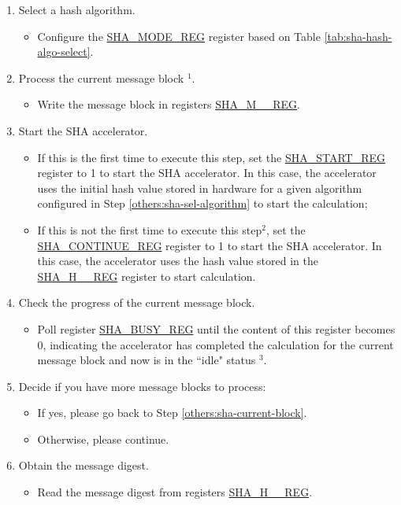 \begin{enumerate}
    \item \label{others:sha-sel-algorithm} Select a hash algorithm.
    \begin{itemize}
        \item Configure the \hyperref[regdesc:SHAMODEREG]{SHA\_MODE\_REG} register based on Table \ref{tab:sha-hash-algo-select}.
    \end{itemize}
    \item \label{others:sha-current-block} Process the current message block \hyperref[others:sha-note-typical-sha]{$^1$}.
    \begin{itemize}
        \item Write the message block in registers \hyperref[regdesc:SHAMNREG]{SHA\_M\_\_REG}.
    \end{itemize}
    \item Start the SHA accelerator.
    \begin{itemize}
        \item If this is the first time to execute this step, set the \hyperref[regdesc:SHASTARTREG]{SHA\_START\_REG} register to 1 to start the SHA accelerator. In this case, the accelerator uses the initial hash value stored in hardware for a given algorithm configured in Step \ref{others:sha-sel-algorithm} to start the calculation;
        \item If this is not the first time to execute this step\hyperref[others:sha-note-typical-sha]{$^2$}, set the \hyperref[regdesc:SHACONTINUEREG]{SHA\_CONTINUE\_REG} register to 1 to start the SHA accelerator. In this case, the accelerator uses the hash value stored in the \hyperref[regdesc:SHAHNREG]{SHA\_H\_\_REG} register to start calculation.
    \end{itemize}
    \item Check the progress of the current message block.
    \begin{itemize}
        \item Poll register \hyperref[regdesc:SHABUSYREG]{SHA\_BUSY\_REG} until the content of this register becomes 0, indicating the accelerator has completed the calculation for the current message block and now is in the ``idle" status \hyperref[others:sha-note-typical-sha]{$^3$}. 
    \end{itemize}
        
    \item Decide if you have more message blocks to process:
    \begin{itemize}
        \item If yes, please go back to Step \ref{others:sha-current-block}.
        \item Otherwise, please continue.
    \end{itemize}

    \item Obtain the message digest.
    \begin{itemize}
        \item Read the message digest from registers \hyperref[regdesc:SHAHNREG]{SHA\_H\_\_REG}.
    \end{itemize}
\end{enumerate}
